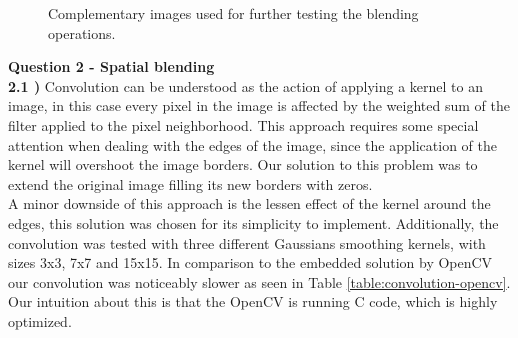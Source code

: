 \documentclass[12pt,a4paper]{article}
\begin{document}
\begin{figure}[!h]
{{		}
	}
	\quad
	\caption{Complementary images used for further testing the blending operations.}
	\label{fig:blendingFurther}
\end{figure}

\newpage

\textbf{\LARGE Question 2 - Spatial blending}\\

\textbf{2.1 )} Convolution can be understood as the action of applying a kernel to an image, in this case every pixel in the image is affected by the weighted sum of the filter applied to the pixel neighborhood. This approach requires some special attention when dealing with the edges of the image, since the application of the kernel will overshoot the image borders. Our solution to this problem was to extend the original image filling its new borders with zeros. \\

A minor downside of this approach is the lessen effect of the kernel around the edges, this solution was chosen for its simplicity to implement. Additionally, the convolution was tested with three different Gaussians smoothing kernels, with sizes 3x3, 7x7 and 15x15. In comparison to the embedded solution by OpenCV our convolution was noticeably slower as seen in Table \ref{table:convolution-opencv}. Our intuition about this is that the OpenCV is running C code, which is highly optimized. \\
\end{document}
